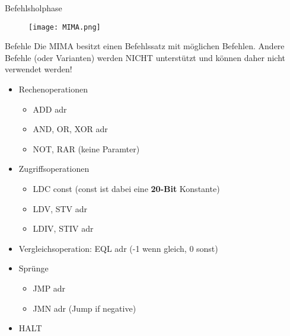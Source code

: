 \begin{frame}{Befehlsholphase}
	\begin{figure}
		\centering
		\texttt{[image: MIMA.png]}
	\end{figure}
	\pause
\end{frame}

\begin{frame}{Befehle}
	Die MIMA besitzt einen Befehlssatz mit möglichen Befehlen. Andere Befehle (oder Varianten) werden NICHT unterstützt und können daher nicht verwendet werden!
	
	\begin{itemize}[<+->]
		\item Rechenoperationen
		\begin{itemize}
			\item ADD adr
			\item AND, OR, XOR adr
			\item NOT, RAR (keine Paramter)
		\end{itemize}
		\item Zugriffsoperationen
		\begin{itemize}
			\item LDC const (const ist dabei eine \textbf{20-Bit} Konstante)
			\item LDV, STV adr
			\item LDIV, STIV adr
		\end{itemize}
		\item Vergleichsoperation: EQL adr (-1 wenn gleich, 0 sonst)
		\item Sprünge
		\begin{itemize}
			\item JMP adr
			\item JMN adr (Jump if negative)
		\end{itemize}
		\item HALT
	\end{itemize}
\end{frame}

